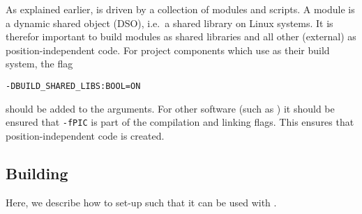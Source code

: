As explained earlier, \MACI is driven by a collection of \PYTHON modules and \PYTHON scripts. A \PYTHON module is a dynamic shared object (DSO), i.e.~a shared library on Linux systems. It is therefor important to build \PYTHON modules as shared libraries and all other (external) as position-independent code. For project components which use \CMAKE as their build system, the flag
\begin{lstlisting}[style=SHELL]
	-DBUILD_SHARED_LIBS:BOOL=ON
\end{lstlisting}
should be added to the \CMAKE arguments. For other software (such as \LAMMPS) it should be ensured that \lstinline[style=CODE]|-fPIC| is part of the compilation and linking flags. This ensures that position-independent code is created.


\subsection{Building \LAMMPS}

Here, we describe how to set-up \LAMMPS such that it can be used with \MACI.

